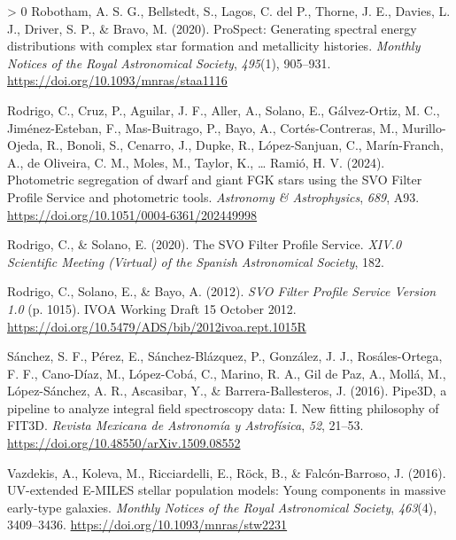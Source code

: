 \documentclass[10pt,a4paper,onecolumn]{article}
\newlength{\cslhangindent}
\newenvironment{CSLReferences}[3]%
{%
	\setlength{\parindent}{0pt}
	\ifodd #1 \everypar{\setlength{\hangindent}{\cslhangindent}}\ignorespaces\fi
	\ifnum #2 > 0
	\setlength{\parskip}{#2\baselineskip}
	\fi
}{}
\begin{document}
\begin{CSLReferences}{1}{0}
		\leavevmode\hypertarget{ref-robotham+20}{}%
		Robotham, A. S. G., Bellstedt, S., Lagos, C. del P., Thorne, J. E.,
		Davies, L. J., Driver, S. P., \& Bravo, M. (2020). {ProSpect}:
		Generating spectral energy distributions with complex star formation and
		metallicity histories. \emph{Monthly Notices of the Royal Astronomical
			Society}, \emph{495}(1), 905--931.
		\url{https://doi.org/10.1093/mnras/staa1116}
		
		\leavevmode\hypertarget{ref-rodrigo+24}{}%
		Rodrigo, C., Cruz, P., Aguilar, J. F., Aller, A., Solano, E.,
		G\'alvez-Ortiz, M. C., Jim\'enez-Esteban, F., Mas-Buitrago, P., Bayo, A.,
		Cort\'es-Contreras, M., Murillo-Ojeda, R., Bonoli, S., Cenarro, J., Dupke,
		R., L\'opez-Sanjuan, C., Mar\'in-Franch, A., de Oliveira, C. M., Moles, M.,
		Taylor, K., \ldots{} Rami\'o, H. V. (2024). {Photometric segregation of
			dwarf and giant FGK stars using the SVO Filter Profile Service and
			photometric tools}. \emph{Astronomy \& Astrophysics}, \emph{689}, A93.
		\url{https://doi.org/10.1051/0004-6361/202449998}
		
		\leavevmode\hypertarget{ref-rodrigo+20}{}%
		Rodrigo, C., \& Solano, E. (2020). {The SVO Filter Profile Service}.
		\emph{XIV.0 Scientific Meeting (Virtual) of the Spanish Astronomical
			Society}, 182.
		
		\leavevmode\hypertarget{ref-rodrigo+12}{}%
		Rodrigo, C., Solano, E., \& Bayo, A. (2012). \emph{{SVO Filter Profile
				Service Version 1.0}} (p. 1015). IVOA Working Draft 15 October 2012.
		\url{https://doi.org/10.5479/ADS/bib/2012ivoa.rept.1015R}
		
		\leavevmode\hypertarget{ref-sanchez+16}{}%
		S\'anchez, S. F., P\'erez, E., S\'anchez-Bl\'azquez, P., Gonz\'alez, J. J.,
		Ros\'ales-Ortega, F. F., Cano-D\'iaz, M., L\'opez-Cob\'a, C., Marino, R. A., Gil
		de Paz, A., Moll\'a, M., L\'opez-S\'anchez, A. R., Ascasibar, Y., \&
		Barrera-Ballesteros, J. (2016). {Pipe3D}, a pipeline to analyze integral
		field spectroscopy data: {I}. New fitting philosophy of {FIT3D}.
		\emph{Revista Mexicana de Astronom\'ia y Astrof\'isica}, \emph{52}, 21--53.
		\url{https://doi.org/10.48550/arXiv.1509.08552}
		
		\leavevmode\hypertarget{ref-vazdekis+16}{}%
		Vazdekis, A., Koleva, M., Ricciardelli, E., Röck, B., \& Falc\'on-Barroso,
		J. (2016). {UV}-extended {E-MILES} stellar population models: Young
		components in massive early-type galaxies. \emph{Monthly Notices of the
			Royal Astronomical Society}, \emph{463}(4), 3409--3436.
		\url{https://doi.org/10.1093/mnras/stw2231}
		

\end{CSLReferences}
\end{document}
